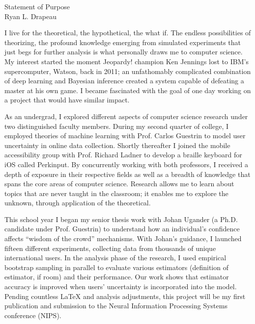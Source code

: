 \setlength{\oddsidemargin}{0in}
\setlength{\evensidemargin}{0in}
\setlength{\textwidth}{6.5in}
\setlength{\topmargin}{-.95in}
\setlength{\textheight}{9.75in}
\pagestyle{empty}



\begin{center}
    {\Large Statement of Purpose}\\[1 mm]
    {\large Ryan L. Drapeau}
\end{center}

I live for the theoretical, the hypothetical, the what if. The endless possibilities of theorizing, the profound knowledge emerging from simulated experiments that just begs for further analysis is what personally draws me to computer science. My interest started the moment Jeopardy! champion Ken Jennings lost to IBM’s supercomputer, Watson, back in 2011; an unfathomably complicated combination of deep learning and Bayesian inference created a system capable of defeating a master at his own game. I became fascinated with the goal of one day working on a project that would have similar impact.\vspace{2 mm}

As an undergrad, I explored different aspects of computer science research under two distinguished faculty members. During my second quarter of college, I employed theories of machine learning with Prof. Carlos Guestrin to model user uncertainty in online data collection. Shortly thereafter I joined the mobile accessibility group with Prof. Richard Ladner to develop a braille keyboard for iOS called Perkinput. By concurrently working with both professors, I received a depth of exposure in their respective fields as well as a breadth of knowledge that spans the core areas of computer science. Research allows me to learn about topics that are never taught in the classroom; it enables me to explore the unknown, through application of the theoretical.\vspace{2 mm}

This school year I began my senior thesis work with Johan Ugander (a Ph.D. candidate under Prof. Guestrin) to understand how an individual’s confidence affects “wisdom of the crowd” mechanisms. With Johan’s guidance, I launched fifteen different experiments, collecting data from thousands of unique international users. In the analysis phase of the research, I used empirical bootstrap sampling in parallel to evaluate various estimators (definition of estimator, if room) and their performance. Our work shows that estimator accuracy is improved when users’ uncertainty is incorporated into the model. Pending countless LaTeX and analysis adjustments, this project will be my first publication and submission to the Neural Information Processing Systems conference (NIPS).\vspace{2 mm}

